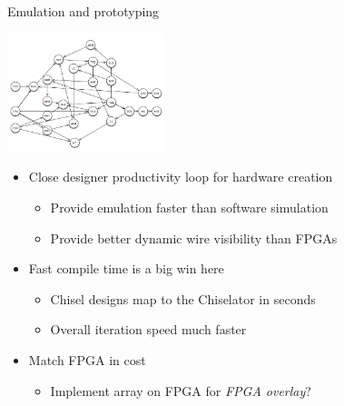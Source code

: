 \documentclass{beamer}
\begin{document}
\begin{frame}{Emulation and prototyping}
\begin{center}
\includegraphics[width=1.8in]{chiselator.png}
\end{center}
\begin{itemize}
\item Close designer productivity loop for hardware creation
\begin{itemize}
\item Provide emulation faster than software simulation
\item Provide better dynamic wire visibility than FPGAs
\end{itemize}
\item Fast compile time is a big win here
\begin{itemize}
\item Chisel designs map to the Chiselator in seconds
\item Overall iteration speed much faster 
\end{itemize}
\item Match FPGA in cost
\begin{itemize}
\item Implement array on FPGA for \textit{FPGA overlay}?
\end{itemize}
\end{itemize}
\end{frame}
\end{document}
